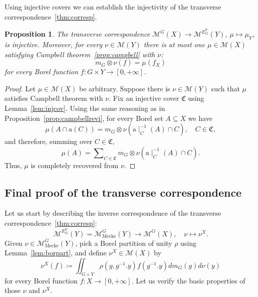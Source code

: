 \documentclass{amsart}
\numberwithin{equation}{subsection}
\newtheorem{prop}[thm]{Proposition}
\theoremstyle{remark}
\begin{document}
Using injective covers we can establish the injectivity of the transverse correspondence~\ref{thm:corresp}.

\begin{prop}\label{prop:injcorres}
The transverse correspondence \(\mathcal{M}^{G}\left(X\right)\to\mathcal{M}^{E_{G}^{Y}}\left(Y\right)\), \(\mu\mapsto\mu_{Y}\), is injective. Moreover, for every \(\nu\in\mathcal{M}\left(Y\right)\) there is at most one \(\mu\in\mathcal{M}\left(X\right)\) satisfying Campbell theorem~\ref{prop:campbell} with \(\nu\):
\[m_{G}\otimes\nu\left(f\right)=\mu\left(f_{X}\right)\]
for every Borel function \(f:G\times Y\to\left[0,+\infty\right]\).
\end{prop}

\begin{proof}
Let \(\mu\in\mathcal{M}\left(X\right)\) be arbitrary. Suppose there is \(\nu\in\mathcal{M}\left(Y\right)\) such that \(\mu\) satisfies Campbell theorem with \(\nu\). Fix an injective cover \(\mathfrak{C}\) using Lemma~\ref{lem:injcov}. Using the same reasoning as in Proposition~\ref{prop:campbellrevi}, for every Borel set \(A\subseteq X\) we have
\[\mu\left(A\cap\mathrm{a}\left(C\right)\right)=m_{G}\otimes\nu\left(\mathrm{a}\mid_{C}^{-1}\left(A\right)\cap C\right),\quad C\in\mathfrak{C},\]
and therefore, summing over \(C\in\mathfrak{C}\),
\[\mu\left(A\right)=\sum\nolimits_{C\in\mathfrak{C}}m_{G}\otimes\nu\left(\mathrm{a}\mid_{C}^{-1}\left(A\right)\cap C\right).\]
Thus, \(\mu\) is completely recovered from \(\nu\).
\end{proof}

\subsection{Final proof of the transverse correspondence}

Let us start by describing the inverse correspondence of the transverse correspondence~\ref{thm:corresp}:
\begin{equation}\label{eq:invcorr}
\mathcal{M}^{E_{G}^{Y}}\left(Y\right)=\mathcal{M}_{\mathrm{Mecke}}^{G}\left(Y\right)\to\mathcal{M}^{G}\left(X\right),\quad \nu\mapsto\nu^{X}.
\end{equation}
Given \(\nu\in\mathcal{M}_{\mathrm{Mecke}}^{G}\left(Y\right)\), pick a Borel partition of unity \(\rho\) using Lemma~\ref{lem:borpart}, and define \(\nu^{X}\in\mathcal{M}\left(X\right)\) by
\[\nu^{X}\left(f\right)\coloneqq \iint\nolimits_{G\times Y}\rho\left(g,g^{-1}.y\right)f\left(g^{-1}.y\right)dm_{G}\left(g\right)d\nu\left(y\right)\]
for every Borel function \(f:X\to\left[0,+\infty\right]\). Let us verify the basic properties of those \(\nu\) and \(\nu^{X}\).
\end{document}
